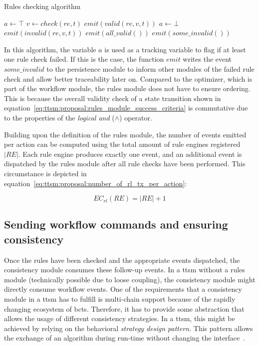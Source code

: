 \begin{algorithm}
\caption{Rules checking algorithm}
\label{alg:ttsm:proposal:rules_checking}
$a \gets \top$\;
{
    $v \gets check(re, t)$\;
    {
        $emit(valid(re, v, t))$\;
    }
    {
        $a \gets \bot$\;
        $emit(invalid(re, v, t))$\;
    }
}
{
    $emit(all\_valid())$\;
}
{
    $emit(some\_invalid())$\;
}
\end{algorithm}

In this algorithm, the variable $a$ is used as a tracking variable to flag if at least one rule check failed. If this is the case, the function $emit$ writes the event $some\_invalid$ to the persistence module to inform other modules of the failed rule check and allow better traceability later on. Compared to the optimizer, which is part of the workflow module, the rules module does not have to ensure ordering. This is because the overall validity check of a state transition shown in equation~\ref{eq:ttsm:proposal:rules_module_success_criteria} is commutative due to the properties of the \textit{logical and} ($\wedge$) operator.

Building upon the definition of the rules module, the number of events emitted per action can be computed using the total amount of rule engines registered $|RE|$. Each rule engine produces exactly one event, and an additional event is dispatched by the rules module after all rule checks have been performed. This circumstance is depicted in equation~\ref{eq:ttsm:proposal:number_of_rl_tx_per_action}:

\begin{equation}
\label{eq:ttsm:proposal:number_of_rl_tx_per_action}
EC_{rl}(RE) = |RE| + 1
\end{equation}


\subsection{Sending workflow commands and ensuring consistency}
\label{sec:ttsm:proposal:entering_blockchain_and_distributing_commands}
Once the rules have been checked and the appropriate events dispatched, the consistency module consumes these follow-up events. In a \gls{ttsm} without a rules module (technically possible due to loose coupling), the consistency module might directly consume workflow events. One of the requirements that a consistency module in a \gls{ttsm} has to fulfill is multi-chain support because of the rapidly changing ecosystem of \glspl{bct}. Therefore, it has to provide some abstraction that allows the usage of different consistency strategies. In a \gls{ttsm}, this might be achieved by relying on the behavioral \textit{strategy design pattern}. This pattern allows the exchange of an algorithm during run-time without changing the interface~\cite{geirhos2015_design_patterns_behavioral}.

